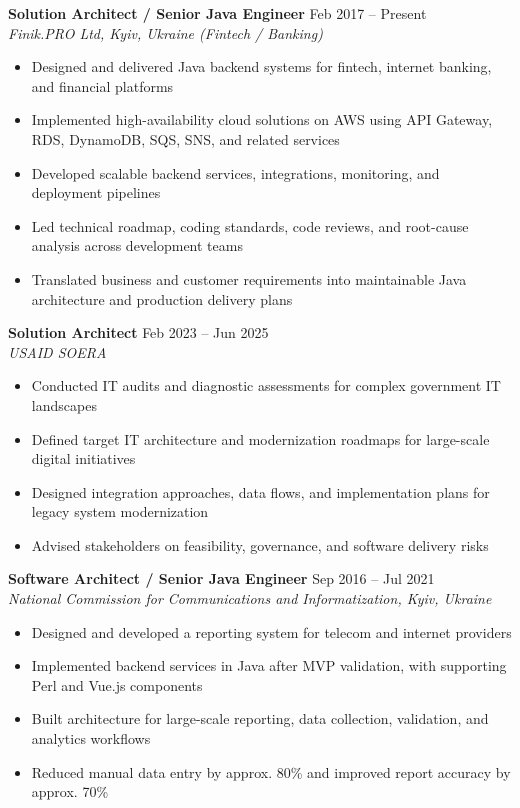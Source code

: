 \documentclass[10pt,a4paper]{article}
\begin{document}
\textbf{Solution Architect / Senior Java Engineer} \hfill Feb 2017 -- Present \\
\textit{Finik.PRO Ltd, Kyiv, Ukraine (Fintech / Banking)}

\begin{itemize}
\item Designed and delivered Java backend systems for fintech, internet banking, and financial platforms
\item Implemented high-availability cloud solutions on AWS using API Gateway, RDS, DynamoDB, SQS, SNS, and related services
\item Developed scalable backend services, integrations, monitoring, and deployment pipelines
\item Led technical roadmap, coding standards, code reviews, and root-cause analysis across development teams
\item Translated business and customer requirements into maintainable Java architecture and production delivery plans
\end{itemize}

\textbf{Solution Architect} \hfill Feb 2023 -- Jun 2025 \\
\textit{USAID SOERA}

\begin{itemize}
\item Conducted IT audits and diagnostic assessments for complex government IT landscapes
\item Defined target IT architecture and modernization roadmaps for large-scale digital initiatives
\item Designed integration approaches, data flows, and implementation plans for legacy system modernization
\item Advised stakeholders on feasibility, governance, and software delivery risks
\end{itemize}

\textbf{Software Architect / Senior Java Engineer} \hfill Sep 2016 -- Jul 2021 \\
\textit{National Commission for Communications and Informatization, Kyiv, Ukraine}

\begin{itemize}
\item Designed and developed a reporting system for telecom and internet providers
\item Implemented backend services in Java after MVP validation, with supporting Perl and Vue.js components
\item Built architecture for large-scale reporting, data collection, validation, and analytics workflows
\item Reduced manual data entry by approx. 80\% and improved report accuracy by approx. 70\%
\end{itemize}
\end{document}
